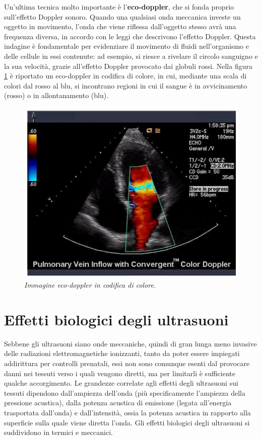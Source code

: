 \documentclass{report}
\newcommand{\figref}[1]{figura \ref{#1}}
\numberwithin{equation}{section}
\numberwithin{figure}{section}
\begin{document}
Un'ultima tecnica molto importante è l'\textbf{eco-doppler}, che si fonda proprio sull'effetto Doppler sonoro. Quando una qualsiasi onda meccanica investe un oggetto in movimento, l'onda che viene riflessa dall'oggetto stesso avrà una frequenza diversa, in accordo con le leggi che descrivono l'effetto Doppler. Questa indagine è fondamentale per evidenziare il movimento di fluidi nell'organismo e delle cellule in essi contenute: ad esempio, si riesce a rivelare il circolo sanguigno e la sua velocità, grazie all'effetto Doppler provocato dai globuli rossi. Nella \figref{fig:ecodoppler} è riportato un eco-doppler in codifica di colore, in cui, mediante una scala di colori dal rosso al blu, si incontrano regioni in cui il sangue è in avvicinamento (rosso) o in allontanamento (blu).

\begin{figure}[htp]
\centering
\includegraphics[scale=0.92]{immagini/ecodoppler.png}
\caption{\label{fig:ecodoppler} \textit{Immagine eco-doppler in codifica di colore}.}
\end{figure}

\section{Effetti biologici degli ultrasuoni}
Sebbene gli ultrasuoni siano onde meccaniche, quindi di gran lunga meno invasive delle radiazioni elettromagnetiche ionizzanti, tanto da poter essere impiegati addirittura per controlli prenatali, essi non sono comunque esenti dal provocare danni nei tessuti verso i quali vengono diretti, ma per limitarli è sufficiente qualche accorgimento. Le grandezze correlate agli effetti degli ultrasuoni sui tessuti dipendono dall'ampiezza dell'onda (più specificamente l'ampiezza della pressione acustica), dalla potenza acustica di emissione (legata all'energia trasportata dall'onda) e dall'intensità, ossia la potenza acustica in rapporto alla superficie sulla quale viene diretta l'onda. Gli effetti biologici degli ultrasuoni si suddividono in termici e meccanici.
\end{document}
